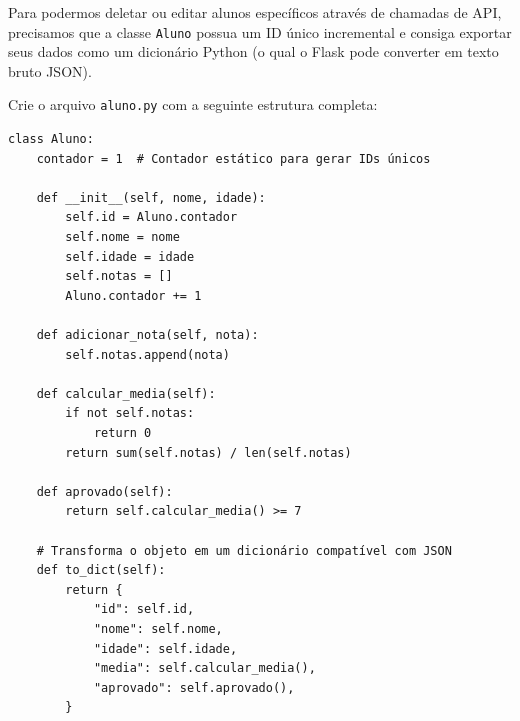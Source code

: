 \documentclass[12pt,a4paper]{article}
\begin{document}
\newpage

\begin{boxAtividade}
\begin{center}
\end{center}

\vspace{0.2cm}

Para podermos deletar ou editar alunos específicos através de chamadas de API, precisamos que a classe \texttt{Aluno} possua um ID único incremental e consiga exportar seus dados como um dicionário Python (o qual o Flask pode converter em texto bruto JSON).

Crie o arquivo \texttt{aluno.py} com a seguinte estrutura completa:

\begin{boxCodigo}
\begin{verbatim}
class Aluno:
    contador = 1  # Contador estático para gerar IDs únicos

    def __init__(self, nome, idade):
        self.id = Aluno.contador
        self.nome = nome
        self.idade = idade
        self.notas = []
        Aluno.contador += 1

    def adicionar_nota(self, nota):
        self.notas.append(nota)

    def calcular_media(self):
        if not self.notas:
            return 0
        return sum(self.notas) / len(self.notas)

    def aprovado(self):
        return self.calcular_media() >= 7

    # Transforma o objeto em um dicionário compatível com JSON
    def to_dict(self):
        return {
            "id": self.id,
            "nome": self.nome,
            "idade": self.idade,
            "media": self.calcular_media(),
            "aprovado": self.aprovado(),
        }
\end{verbatim}
\end{boxCodigo}
\end{boxAtividade}
\end{document}
